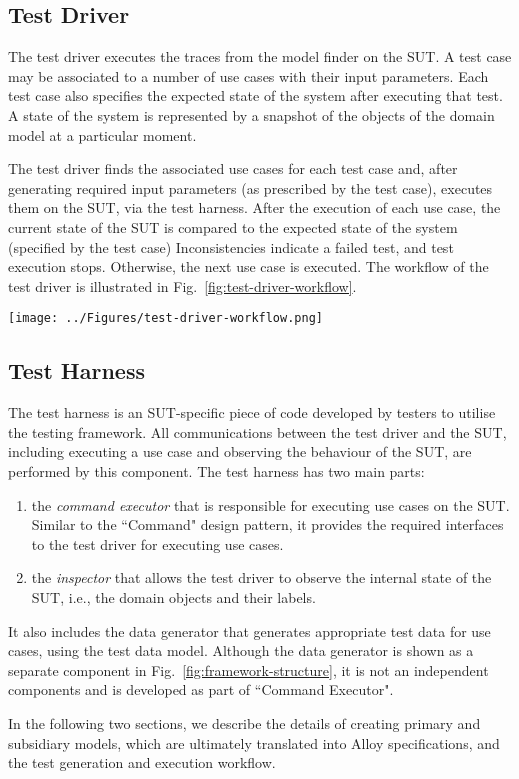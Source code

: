 \subsection{Test Driver}
\label{sec:framework-overview-test-driver}
The test driver executes the traces from the model finder on the SUT. A test case may be associated to  a number of use cases with their input parameters. Each test case also specifies the expected state of the system after executing that test. A state of the system is represented by a snapshot of the objects of the domain model at a particular moment. 

The test driver finds the associated use cases for each test case and, after generating required input parameters (as prescribed by the test case), executes them on the SUT, via the test harness. After the execution of each use case, the current state of the SUT is compared to the expected state of the system (specified by the test case) Inconsistencies indicate a failed test, and test execution stops. Otherwise, the next use case is executed.  The workflow of the test driver is illustrated in Fig.~\ref{fig:test-driver-workflow}.

\begin{figure*}[!t]
\centering
\texttt{[image: ../Figures/test-driver-workflow.png]}
\caption{The workflow of the test driver.}
\label{fig:test-driver-workflow}
\end{figure*}

\subsection{Test Harness}
\label{sec:framework-overview-test-harness}
The test harness is an SUT-specific piece of code developed by testers to utilise the testing framework. All communications between the test driver and the SUT, including executing a use case and observing the behaviour of the SUT, are performed by this component. The test harness has two main parts: 
\begin{enumerate}
	\item the \textit{command executor} that is responsible for executing use cases on the SUT. Similar to the ``Command" design pattern, it provides the required interfaces to the test driver for executing use cases. 
	
	\item the \textit{inspector} that allows the test driver to observe the internal state of the SUT, i.e., the domain objects and their labels.
\end{enumerate}

It also includes the data generator that generates appropriate test data for use cases, using the test data model. Although the data generator is shown as a separate component in Fig.~\ref{fig:framework-structure}, it is not an independent components and is developed as part of ``Command Executor". 

In the following two sections, we describe the details of creating primary and subsidiary models, which are ultimately translated into Alloy specifications, and the test generation and execution workflow.